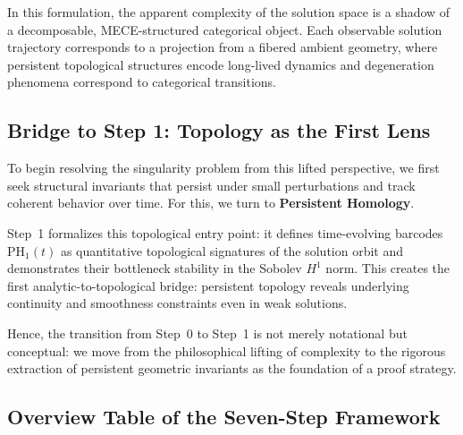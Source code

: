 \documentclass[11pt]{article}
\theoremstyle{definition}
\begin{document}
In this formulation, the apparent complexity of the solution space is a shadow of a decomposable, MECE-structured categorical object. Each observable solution trajectory corresponds to a projection from a fibered ambient geometry, where persistent topological structures encode long-lived dynamics and degeneration phenomena correspond to categorical transitions.

\subsection*{Bridge to Step 1: Topology as the First Lens}

To begin resolving the singularity problem from this lifted perspective, we first seek structural invariants that persist under small perturbations and track coherent behavior over time. For this, we turn to \textbf{Persistent Homology}.

Step~1 formalizes this topological entry point: it defines time-evolving barcodes $\mathrm{PH}_1(t)$ as quantitative topological signatures of the solution orbit and demonstrates their bottleneck stability in the Sobolev $H^1$ norm. This creates the first analytic-to-topological bridge: persistent topology reveals underlying continuity and smoothness constraints even in weak solutions.

Hence, the transition from Step~0 to Step~1 is not merely notational but conceptual: we move from the philosophical lifting of complexity to the rigorous extraction of persistent geometric invariants as the foundation of a proof strategy.

\subsection*{Overview Table of the Seven-Step Framework}
\end{document}
